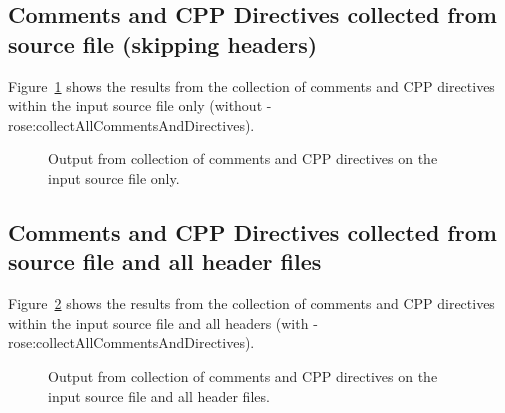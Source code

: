 \subsection{Comments and CPP Directives collected from source file (skipping headers)}

   Figure~\ref{Tutorial:exampleOutput_collectComments} 
shows the results from the collection of comments and CPP directives within the input
source file only (without -rose:collectAllCommentsAndDirectives).

\begin{figure}[!h]
{\indent
{\mySmallFontSize

\begin{latexonly}
   
\end{latexonly}

\begin{htmlonly}
   
\end{htmlonly}

}
}
\caption{Output from collection of comments and CPP directives on the input source file only.}
\label{Tutorial:exampleOutput_collectComments}
\end{figure}


\subsection{Comments and CPP Directives collected from source file and all header files}

   Figure~\ref{Tutorial:exampleOutput_collectComments_including_headers} 
shows the results from the collection of comments and CPP directives within the input
source file and all headers (with -rose:collectAllCommentsAndDirectives).

\begin{figure}[!h]
{\indent
{\mySmallFontSize

\begin{latexonly}
   
\end{latexonly}

\begin{htmlonly}
   
\end{htmlonly}

}
}
\caption{Output from collection of comments and CPP directives on the input source file
    and all header files.}
\label{Tutorial:exampleOutput_collectComments_including_headers}
\end{figure}




